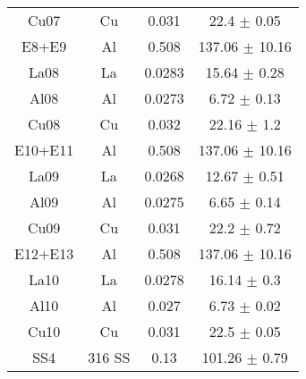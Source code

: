 \begin{ruledtabular}
\begin{tabular}{cccc}
Cu07 & Cu & 0.031 & 22.4 $\pm$ 0.05 \\
E8+E9 & Al & 0.508 & 137.06 $\pm$ 10.16 \\
La08 & La & 0.0283 & 15.64 $\pm$ 0.28 \\
Al08 & Al & 0.0273 & 6.72 $\pm$ 0.13 \\
Cu08 & Cu & 0.032 & 22.16 $\pm$ 1.2 \\
E10+E11 & Al & 0.508 & 137.06 $\pm$ 10.16 \\
La09 & La & 0.0268 & 12.67 $\pm$ 0.51 \\
Al09 & Al & 0.0275 & 6.65 $\pm$ 0.14 \\
Cu09 & Cu & 0.031 & 22.2 $\pm$ 0.72 \\
E12+E13 & Al & 0.508 & 137.06 $\pm$ 10.16 \\
La10 & La & 0.0278 & 16.14 $\pm$ 0.3 \\
Al10 & Al & 0.027 & 6.73 $\pm$ 0.02 \\
Cu10 & Cu & 0.031 & 22.5 $\pm$ 0.05 \\
SS4 & 316 SS & 0.13 & 101.26 $\pm$ 0.79 \\\end{tabular}
\label{table:stack}
\end{ruledtabular}
\ \ 
